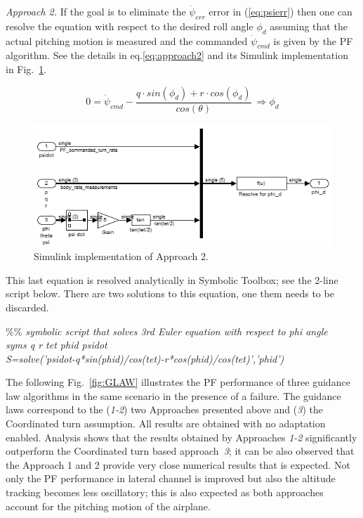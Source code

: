 \documentclass[]{article}
\begin{document}
\emph{Approach 2.} If the goal is to eliminate the $\dot{\psi}_{err}$ error in (\ref{eq:psierr}) then one can resolve the equation with respect to the desired roll angle $\phi_d$ assuming that the actual pitching motion is measured and the commanded $\dot{\psi}_{cmd}$ is given by the PF algorithm. See the details in eq.\ref{eq:approach2} and its Simulink implementation  in Fig.~\ref{fig:Approach2}.

\begin{equation}
\label{eq:approach2}
	0=\dot{\psi}_{cmd} - \frac {q \cdot sin(\phi_d)+ r \cdot cos(\phi_d)} {cos(\theta)}~\Rightarrow \phi_d	
\end{equation}

\begin{figure}[thpb]
      \centering
      \includegraphics[width=128mm]{approach2.png}
      \caption{Simulink implementation of Approach 2.}
      \label{fig:Approach2}
   \end{figure}

This last equation is resolved analytically in Symbolic Toolbox; see the 2-line script below. There are two solutions to this equation, one them needs to be discarded.

\emph{
$\%\%$ symbolic script that solves 3rd Euler equation with respect to phi angle\\
syms q r tet phid psidot\\
S=solve('psidot-q*sin(phid)/cos(tet)-r*cos(phid)/cos(tet)','phid')\\
}

The following Fig.~\ref{fig:GLAW} illustrates the PF performance of three guidance law algorithms in the same scenario in the presence of a failure. The guidance laws correspond to the (\emph{1-2}) two Approaches presented above and (\emph{3}) the Coordinated turn assumption. All results are obtained with no adaptation enabled. Analysis shows that the results obtained by Approaches \emph{1-2} significantly outperform the Coordinated turn based approach~\emph{3}; it can be also  observed that the Approach 1 and 2 provide very close numerical results that is expected. Not only the PF performance in lateral channel is improved but also the altitude tracking becomes less oscillatory; this is also expected as both approaches account for the pitching motion of the airplane.
\end{document}
